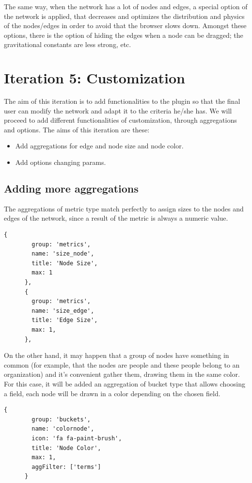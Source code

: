 \documentclass[a4paper, 12pt]{book}
\begin{document}
The same way, when the network has a lot of nodes and edges, a special option of the network is applied, that decreases and optimizes the distribution and physics of the nodes/edges in order to avoid that the browser slows down. Amongst these options, there is the option of hiding the edges when a node can be dragged; the gravitational constants are less strong, etc.

\section{Iteration 5: Customization}

The aim of this iteration is to add functionalities to the plugin so that the final user can modify the network and adapt it to the criteria he/she has. We will proceed to add different functionalities of customization, through aggregations and options. The aims of this iteration are these:

\begin{itemize}
\item Add aggregations for edge and node size and node color.
\item Add options changing params.
\end{itemize}

\subsection{Adding more aggregations}

The aggregations of metric type match perfectly to assign sizes to the nodes and edges of the network, since a result of the metric is always a numeric value.

\begin{lstlisting}[frame=single]
	  {
        group: 'metrics',
        name: 'size_node',
        title: 'Node Size',
        max: 1
      },
      {
        group: 'metrics',
        name: 'size_edge',
        title: 'Edge Size',
        max: 1,
      },
\end{lstlisting}

On the other hand, it may happen that a group of nodes have something in common (for example, that the nodes are people and these people belong to an organization) and it’s convenient gather them, drawing them in the same color. For this case, it will be added an aggregation of bucket type that allows choosing a field, each node will be drawn in a color depending on the chosen field.

\begin{lstlisting}[frame=single]
      {
        group: 'buckets',
        name: 'colornode',
        icon: 'fa fa-paint-brush',
        title: 'Node Color',
        max: 1,
        aggFilter: ['terms']
      }
\end{lstlisting}
\end{document}
